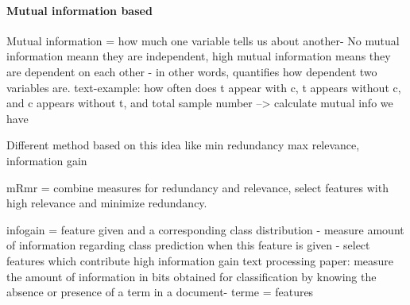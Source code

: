 \paragraph{Mutual information based}
\label{par:methods.flat.filter.mutual_information}

  
Mutual information  = how much one variable tells us about another- No mutual information meann they are independent, high mutual information means they are dependent on each other - in other words, quantifies how dependent two variables are. text-example: how often does t appear with c, t appears without c, and c appears without t, and total sample number --> calculate mutual info we have

Different method based on this idea like min redundancy max relevance, information gain

mRmr = combine measures for redundancy and relevance, select features with high relevance and minimize redundancy.

infogain = feature given and a corresponding class distribution - measure amount of information regarding class prediction when this feature is given - select features which contribute high information gain
text processing paper: measure the amount of information in bits obtained for classification by knowing the absence or presence of a term in a document- terme = features